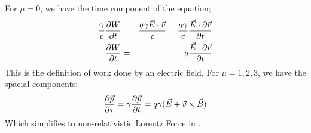 \documentclass[a4paper,oneside,12pt]{report}
\numberwithin{equation}{chapter}
\begin{document}
For $ \mu = 0 $, we have the time component of the equation;
\begin{eqnarray}
    \frac{\gamma}{c}\frac{\partial W}{\partial t} &=& \frac{q \gamma \vec{E}\cdot \vec{v}}{c} = \frac{q \gamma}{c}  \frac{\vec{E}  \cdot \partial \vec{r}}{\partial t} \\
    \frac{\partial W}{\partial t} &=& q \frac{\vec{E}\cdot \partial \vec{r}} {\partial t}
\end{eqnarray}
This is the definition of work done by an electric field. For $ \mu = 1,2,3 $, we have the spacial components;
\begin{equation*}
    \frac{\partial \vec{p}}{\partial \tau} = \gamma \frac{\partial \vec{p}}{\partial t} = q \gamma (\vec{E} + \vec{v} \times \vec{B})
\end{equation*}
Which simplifies to non-relativistic Lorentz Force in .
\end{document}
